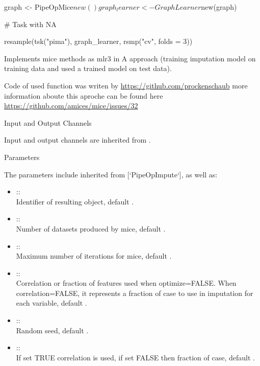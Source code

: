 \documentclass[letterpaper]{book}
\begin{document}
%
\begin{Examples}
\begin{ExampleCode}
{
  graph <- PipeOpMice$new() %
  graph_learner <- GraphLearner$new(graph)

  # Task with NA

  resample(tsk("pima"), graph_learner, rsmp("cv", folds = 3))
}
\end{ExampleCode}
\end{Examples}
%
\begin{Description}\relax
Implements mice methods as mlr3 in A approach (training imputation model on training data and used a trained model on test data).
\end{Description}
%
\begin{Details}\relax
Code of used function was writen by \url{https://github.com/prockenschaub} more information aboute this aproche can be found here \url{https://github.com/amices/mice/issues/32}
\end{Details}
%
\begin{Section}{Input and Output Channels}

Input and output channels are inherited from .
\end{Section}
%
\begin{Section}{Parameters}

The parameters include inherited from [`PipeOpImpute`], as well as: \\{}
\begin{itemize}

\item{}  :: \\{}
Identifier of resulting object, default .
\item{}  :: \\{}
Number of datasets produced by mice, default .
\item{}  :: \\{}
Maximum number of iterations for mice, default .
\item{}  :: \\{}
Correlation or fraction of features used when optimize=FALSE. When correlation=FALSE, it represents a fraction of case to use in imputation for each variable, default .
\item{}  :: \\{}
Random seed, default .
\item{}  :: \\{}
If set TRUE correlation is used, if set FALSE then fraction of case, default .

\end{itemize}

\end{Section}
\end{document}
